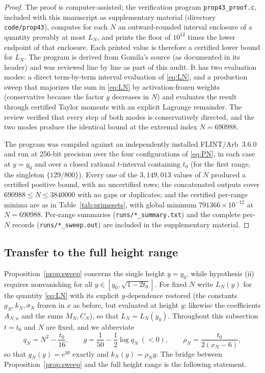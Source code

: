 \documentclass[11pt]{article}
\theoremstyle{definition}
\begin{document}
\begin{proof}
The proof is computer-assisted; 
the verification program \texttt{prop43\_proof.c}, included with
this manuscript as supplementary material (directory
\texttt{code/prop43}), computes for each $N$ an outward-rounded
interval enclosure of a quantity provably at most $L_N$, and prints
the floor of $10^{12}$ times the lower endpoint of that enclosure.
Each printed value is therefore a certified lower bound for $L_N$.
The program is derived from Gomila's source (as documented in its
header) and was reviewed line by line as part of this audit. It has
two evaluation modes: a direct term-by-term interval evaluation of
\eqref{eq:LN}, and a production sweep that majorizes the sum in
\eqref{eq:LN} by activation-frozen weights (conservative because the
factor $g$ decreases in $N$) and evaluates the result through
certified Taylor moments with an explicit Lagrange remainder. The
review verified that every step of both modes is conservatively
directed, and the two modes produce the identical bound at the
extremal index $N=690988$.

The program was compiled against an independently installed
FLINT/Arb~3.6.0 and run at 256-bit precision over the four
configurations of \eqref{eq:PN}, in each case at $y=y_0$ and over a
closed rational $t$-interval containing $t_0$ (for the first range,
the singleton $\{129/800\}$). Every one of the $3{,}149{,}013$
values of $N$ produced a certified positive bound, with no
uncertified rows; the concatenated outputs cover
$690988\le N\le3840000$ with no gaps or duplicates; and the
certified per-range minima are as in Table~\ref{tab:primesets}, with
global minimum $791366\times10^{-12}$ at $N=690988$. Per-range
summaries (\texttt{runs/*\_summary.txt}) and the complete per-$N$
records (\texttt{runs/*\_sweep.out}) are included in the
supplementary material. 
\end{proof}

\subsection{Transfer to the full height range}\label{sec:dini}

Proposition~\ref{prop:sweep} concerns the single height $y=y_0$,
while hypothesis (ii) requires nonvanishing for all
$y\in[y_0,\sqrt{1-2t_0}]$. For fixed $N$ write $L_N(y)$ for the
quantity \eqref{eq:LN} with its explicit $y$-dependence restored
(the constants $g_N,k_N,\sigma_N$ frozen in $x$ as before, but
evaluated at height $y$; likewise the coefficients $A_{N,n}$ and the
sums $M_N,C_N$), so that $L_N=L_N(y_0)$. Throughout this subsection
$t=t_0$ and $N$ are fixed, and we abbreviate
\[
q_N=N^2-\frac{t_0}{16},
\qquad
g=\frac1{50}-\frac12\log q_N\ (<0),
\qquad
\rho_N=\frac{t_0}{2(x_N-6)},
\]
so that $g_N(y)=e^{yg}$ exactly and $k_N(y)=\rho_Ny$. The bridge
between Proposition~\ref{prop:sweep} and the full height range is
the following statement.
\end{document}
